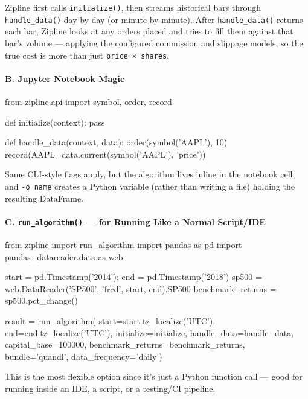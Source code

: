 \documentclass[12pt,openany]{book}
\theoremstyle{definition}
\theoremstyle{remark}
\begin{document}
Zipline first calls \texttt{initialize()}, then streams historical bars through \texttt{handle\_data()} day by day (or minute by minute). After \texttt{handle\_data()} returns each bar, Zipline looks at any orders placed and tries to fill them against that bar's volume — applying the configured commission and slippage models, so the true cost is more than just \texttt{price × shares}.

\paragraph{B. Jupyter Notebook Magic}

\begin{python}
\end{python}

\begin{python}
from zipline.api import symbol, order, record

def initialize(context):
    pass

def handle_data(context, data):
    order(symbol('AAPL'), 10)
    record(AAPL=data.current(symbol('AAPL'), 'price'))
\end{python}

Same CLI-style flags apply, but the algorithm lives inline in the notebook cell, and \texttt{-o name} creates a Python variable (rather than writing a file) holding the resulting DataFrame.

\paragraph{C. \texttt{run\_algorithm()} — for Running Like a Normal Script/IDE}

\begin{python}
from zipline import run_algorithm
import pandas as pd
import pandas_datareader.data as web

start = pd.Timestamp('2014'); end = pd.Timestamp('2018')
sp500 = web.DataReader('SP500', 'fred', start, end).SP500
benchmark_returns = sp500.pct_change()

result = run_algorithm(
    start=start.tz_localize('UTC'), end=end.tz_localize('UTC'),
    initialize=initialize, handle_data=handle_data,
    capital_base=100000, benchmark_returns=benchmark_returns,
    bundle='quandl', data_frequency='daily')
\end{python}

This is the most flexible option since it's just a Python function call — good for running inside an IDE, a script, or a testing/CI pipeline.
\end{document}
